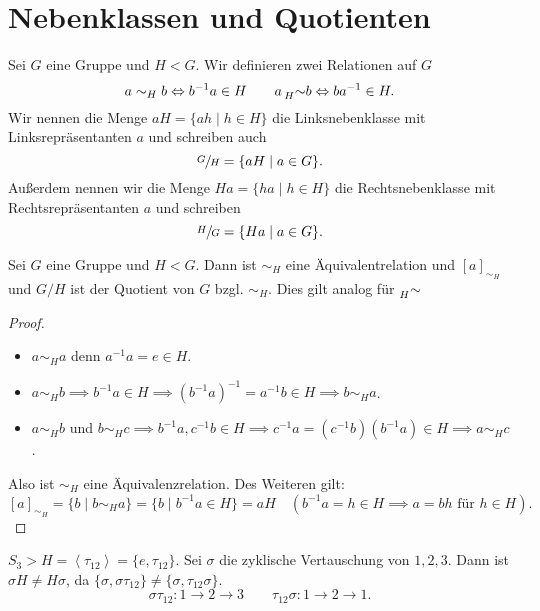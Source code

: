 \section{Nebenklassen und Quotienten}

\begin{definition}
	Sei $G$ eine Gruppe und $H < G$.
	Wir definieren zwei Relationen auf $G$ 
	\[
		a \sim_{H} b \Leftrightarrow b^{-1} a \in H \qquad a \prescript{}{H}{\sim} b \Leftrightarrow b a^{-1} \in H
	.\] 
	Wir nennen die Menge $a H = \{a h \mid h \in H\} $ die Linksnebenklasse mit Linksrepräsentanten $a$ und schreiben auch
	\[
	\sfrac{G}{H} = \{a H \mid a \in G\} 
	.\] 
	Außerdem nennen wir die Menge $H a = \{h a \mid h \in H\} $ die Rechtsnebenklasse mit Rechtsrepräsentanten $a$ und schreiben 
	\[
	\sfrac{H}{G} = \{H a \mid a \in G\} 
	.\] 
\end{definition}

\begin{lemma}
	Sei $G$ eine Gruppe und $H < G$. Dann ist $\sim_{H}$ eine Äquivalentrelation und $[ a ]_{\sim_{H}}$ und $G / H$ ist der Quotient von $G$ bzgl. $\sim_{H}$.
	Dies gilt analog für $\prescript{}{H}{\sim}$
\end{lemma}

\begin{proof}
	\begin{itemize}
		\item $a \sim_{H} a$ denn $a^{-1} a = e \in H$.
		\item $a \sim_{H} b \implies b^{-1} a \in H \implies (b^{-1} a)^{-1} = a^{-1} b \in H \implies b \sim_{H} a$.
		\item $a \sim_{H} b $ und $b \sim_{H} c \implies b^{-1} a, c^{-1} b \in H \implies c^{-1} a = (c^{-1} b) (b^{-1} a) \in H \implies a \sim_{H} c$.
	\end{itemize}
	Also ist $\sim_{H}$ eine Äquivalenzrelation. Des Weiteren gilt:
	\[
		[ a ]_{\sim_{H}} = \{b \mid b \sim_{H} a \}  = \{b \mid b^{-1} a \in H\} = a H \quad (b^{-1} a = h \in H \implies a = b h \text{ für } h \in H)
	.\] 
\end{proof}

\begin{eg}	
	$S_{3} > H = \left< \tau_{12} \right> = \{e, \tau_{12}\} $. Sei $\sigma$ die zyklische Vertauschung von  $1,2,3$.
	Dann ist  $\sigma H \neq H \sigma$, da $\{\sigma, \sigma \tau_{12}\} \neq \{\sigma, \tau_{12} \sigma\} $.
	\[
	\sigma \tau_{12}: 1 \to 2 \to 3 \qquad \tau_{12} \sigma : 1 \to 2 \to 1
	.\] 
\end{eg}

